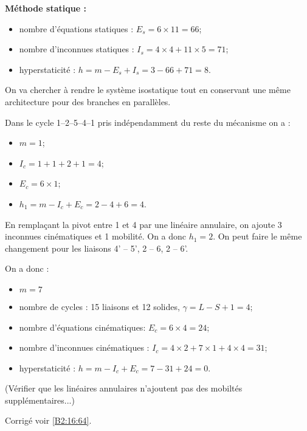\textbf{Méthode statique : }
\begin{itemize}
\item nombre d'équations statiques : $E_s = 6\times 11 = 66$;
\item nombre d'inconnues statiques : $I_s = 4 \times 4+ 11 \times 5 = 71$;
\item hyperstaticité : $h=m-E_s + I_s = 3 -66 + 71 = 8$.
\end{itemize}


\else 
\fi

\ifprof
On va chercher à rendre le système isostatique tout en conservant une même architecture pour des branches en parallèles.

Dans le cycle 1--2--5--4--1 pris indépendamment du reste du mécanisme on a :
\begin{itemize}
\item $m=1$;
\item $I_c = 1+1+2+1 = 4$;
\item $E_c =6 \times 1$;
\item $h_1 = m-I_c +E_c = 2 -4 +6 =4$. 
\end{itemize}

En remplaçant la pivot entre 1 et 4 par une linéaire annulaire, on ajoute 3 inconnues cinématiques et 1 mobilité. 
On a donc $h_1 = 2$. On peut faire le même changement pour les liaisons 4' -- 5', 2 -- 6, 2 -- 6'.

On a donc :
\begin{itemize}
\item $m=7$
\item nombre de cycles : 15 liaisons et 12 solides, $\gamma = L- S + 1 =4$;
\item nombre d'équations cinématiques: $E_c = 6\times 4 = 24$;
\item nombre d'inconnues cinématiques : $I_c = 4 \times 2+ 7 \times 1+ 4 \times 4 = 31$;
\item hyperstaticité : $h=m-I_c + E_c = 7 -31 + 24 = 0$.
\end{itemize}
  
(Vérifier que les linéaires annulaires n'ajoutent pas des mobiltés supplémentaires...)

\else 
\fi
 
 

\ifprof
\else
\ifcolle
\else
\noindent\footnotesize
\normalsize
\fi

\begin{flushright}
\footnotesize{Corrigé  voir \ref{B2:16:64}.}
\end{flushright}%
\fi